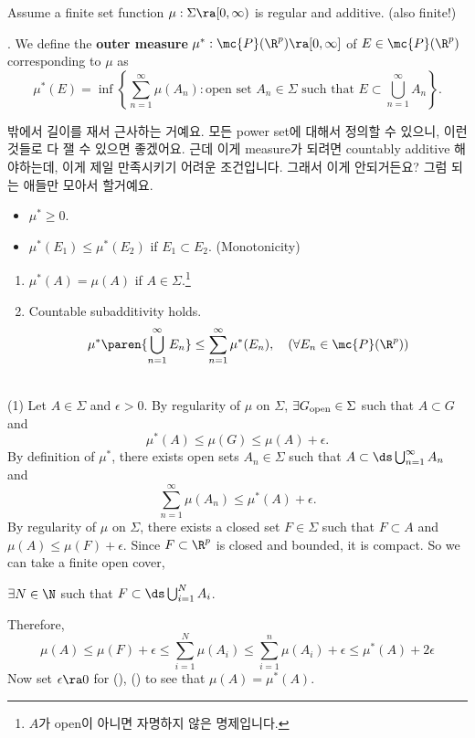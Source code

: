 Assume a finite set function \(\mu: \Sigma \ra [0, \infty)\) is regular and additive. (also finite!)

.  We define the \textbf{outer measure} \(\mu^\ast: \mc{P}(\R^p) \ra [0, \infty]\) of \(E \in \mc{P}(\R^p)\) corresponding to \(\mu\) as
\[
    \mu^\ast(E) = \inf \left\{\sum_{n=1}^\infty \mu(A_n) : \text{open set } A_n \in \Sigma \text{ such that } E \subset \bigcup_{n=1}^\infty A_n\right\}.
\]

밖에서 길이를 재서 근사하는 거예요. 모든 power set에 대해서 정의할 수 있으니, 이런 것들로 다 잴 수 있으면 좋겠어요. 근데 이게 measure가 되려면 countably additive 해야하는데, 이게 제일 만족시키기 어려운 조건입니다. 그래서 이게 안되거든요? 그럼 되는 애들만 모아서 할거예요.

\rmk
\begin{itemize}
    \item \(\mu^\ast \geq 0\).
    \item \(\mu^\ast(E_1) \leq \mu^\ast(E_2)\) if \(E_1 \subset E_2\). (Monotonicity)
\end{itemize}

\begin{enumerate}
    \item \(\mu^\ast(A) = \mu(A)\) if \(A \in \Sigma\).\footnote{\(A\)가 open이 아니면 자명하지 않은 명제입니다.}
    \item Countable subadditivity holds.
          \[
              \mu^\ast\paren{\bigcup_{n=1}^\infty E_n} \leq \sum_{n=1}^\infty \mu^\ast(E_n), \quad (\forall E_n \in \mc{P}(\R^p))
          \]
\end{enumerate}

\pf \\
(1) Let \(A \in \Sigma\) and \(\epsilon > 0\). By regularity of \(\mu\) on \(\Sigma\), \(\exists G_{\rm{open}} \in \Sigma\) such that \(A \subset G\) and
\[ \tag{\mast}
    \mu^\ast(A) \leq \mu(G) \leq \mu(A) + \epsilon.
\]
By definition of \(\mu^\ast\), there exists open sets \(A_n \in \Sigma\) such that \(A \subset \ds \bigcup_{n=1}^\infty A_n\) and
\[
    \sum_{n=1}^\infty \mu(A_n) \leq \mu^\ast(A) + \epsilon.
\]
By regularity of \(\mu\) on \(\Sigma\), there exists a closed set \(F \in \Sigma\) such that \(F\subset A\) and \(\mu(A) \leq \mu(F) + \epsilon\). Since \(F \subset \R^p\) is closed and bounded, it is compact. So we can take a finite open cover,
\begin{center}
    \(\exists N \in \N\) such that \(F \subset \ds\bigcup_{i=1}^N A_{i}\).
\end{center}
Therefore,
\[ \tag{\mast\mast}
    \mu(A) \leq \mu(F) + \epsilon \leq \sum_{i=1}^N \mu(A_i) \leq \sum_{i=1}^n \mu(A_i) + \epsilon \leq \mu^\ast(A) + 2\epsilon
\]
Now set \(\epsilon \ra 0\) for (\mast), (\mast\mast) to see that \(\mu(A) = \mu^\ast(A)\).

